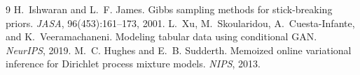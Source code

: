 \documentclass[11pt]{article}
\begin{document}
\begin{thebibliography}{9}\small
{} H.~Ishwaran and L.~F. James. Gibbs sampling methods for stick-breaking priors. \emph{JASA}, 96(453):161--173, 2001.
 L.~Xu, M.~Skoularidou, A.~Cuesta-Infante, and K.~Veeramachaneni. Modeling tabular data using conditional GAN. \emph{NeurIPS}, 2019.
 M.~C. Hughes and E.~B. Sudderth. Memoized online variational inference for Dirichlet process mixture models. \emph{NIPS}, 2013.
\end{thebibliography}
\end{document}
